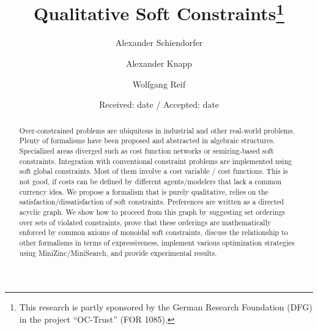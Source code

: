 \documentclass[smallcondensed]{svjour3}     %
\begin{document}
\title{Qualitative Soft Constraints\thanks{This research is partly sponsored by the 
German Research Foundation (DFG) in the project ``OC-Trust'' (FOR 1085).}
}


\author{Alexander Schiendorfer \and Alexander Knapp \and Wolfgang Reif %
}



\date{Received: date / Accepted: date}


\maketitle

\begin{abstract}
Over-constrained problems are ubiquitous in industrial and other real-world problems.
Plenty of formalisms have been proposed and abstracted in algebraic structures.
Specialized areas diverged such as cost function networks or semiring-based soft constraints.
Integration with conventional constraint problems are implemented using soft global constraints.
Most of them involve a cost variable / cost functions. This is not good, if costs can be defined
by different agents/modelers that lack a common currency idea. We propose a formalism that is purely 
qualitative, relies on the satisfaction/dissatisfaction of soft constraints. Preferences are written
as a directed acyclic graph. We show how to proceed from this graph by suggesting set orderings over
sets of violated constraints, prove that these orderings are mathematically enforced by common axioms
of monoidal soft constraints, discuss the relationship to other formalisms in terms of expressiveness,
implement various optimization strategies using MiniZinc/MiniSearch, and provide experimental results.

\end{abstract}
\end{document}
